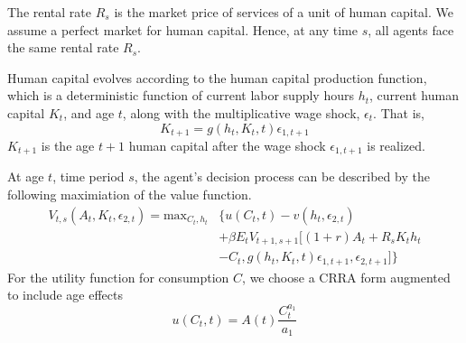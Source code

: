 \documentclass{article}
\begin{document}
The rental rate $R_s$ is the market price of services of a unit of human capital. We assume a perfect market for human capital. Hence, at any time $s$, all agents face the same rental rate $R_s$. \par
Human capital evolves according to the human capital production function, which is a deterministic function of current labor supply hours $h_t$, current human capital $K_t$, and age $t$, along with the multiplicative wage shock, $\epsilon_t$. That is,
\begin{equation} \tag{4}
  \label{eq:HCevolution}
  K_{t+1} = g(h_t, K_t, t) \epsilon_{1,t+1}
\end{equation}
$K_{t+1}$ is the age $t+1$ human capital after the wage shock $\epsilon_{1,t+1}$ is realized. \par
At age $t$, time period $s$, the agent's decision process can be described by the following maximiation of the value function.
\begin{equation} \tag{5}
  \begin{split}
      V_{t,s}(A_t,K_t,\epsilon_{2,t})=\text{max}_{C_t,h_t} & \{u(C_t,t)-v(h_t, \epsilon_{2,t}) \\ & + \beta E_t V_{t+1,s+1}[(1+r)A_t + R_s K_t h_t \\ & -C_t, g(h_t,K_t,t)\epsilon_{1,t+1}, \epsilon_{2,t+1}]\}
  \end{split}
\end{equation}
    For the utility function for consumption $C$, we choose a CRRA form augmented to include age effects
    \begin{equation*}
      u(C_t,t)=A(t)\dfrac{C_t^{a_1}}{a_1}
    \end{equation*}
\end{document}
